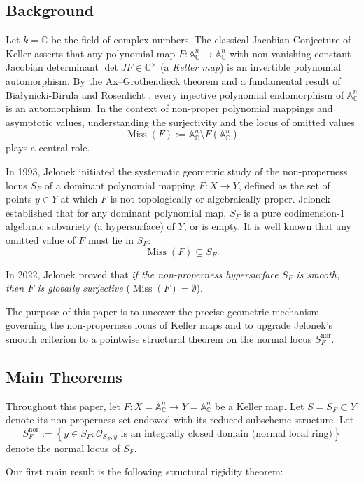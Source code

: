 \documentclass[11pt,reqno]{amsart}
\theoremstyle{plain}
\theoremstyle{definition}
\numberwithin{equation}{section}
\DeclareMathOperator{\Miss}{Miss}
\newcommand{\A}{\mathbb{A}}
\newcommand{\C}{\mathbb{C}}
\newcommand{\cO}{\mathcal{O}}
\begin{document}
\subsection{Background}
Let $k = \C$ be the field of complex numbers. The classical Jacobian Conjecture of Keller \cite{Keller1939} asserts that any polynomial map $F: \A^n_\C \to \A^n_\C$ with non-vanishing constant Jacobian determinant $\det JF \in \C^\times$ (a \emph{Keller map}) is an invertible polynomial automorphism. By the Ax--Grothendieck theorem and a fundamental result of Bia{\l}ynicki-Birula and Rosenlicht \cite{BiaRosen1962}, every injective polynomial endomorphism of $\A^n_\C$ is an automorphism. In the context of non-proper polynomial mappings and asymptotic values, understanding the surjectivity and the locus of omitted values
\[
\Miss(F) := \A^n_\C \setminus F(\A^n_\C)
\]
plays a central role.

In 1993, Jelonek \cite{Jelonek1993} initiated the systematic geometric study of the non-properness locus $S_F$ of a dominant polynomial mapping $F: X \to Y$, defined as the set of points $y \in Y$ at which $F$ is not topologically or algebraically proper. Jelonek established that for any dominant polynomial map, $S_F$ is a pure codimension-1 algebraic subvariety (a hypersurface) of $Y$, or is empty. It is well known that any omitted value of $F$ must lie in $S_F$:
\[
\Miss(F) \subseteq S_F.
\]

In 2022, Jelonek \cite{Jelonek2022} proved that \emph{if the non-properness hypersurface $S_F$ is smooth, then $F$ is globally surjective} ($\Miss(F) = \emptyset$). 

The purpose of this paper is to uncover the precise geometric mechanism governing the non-properness locus of Keller maps and to upgrade Jelonek's smooth criterion to a pointwise structural theorem on the normal locus $S_F^{\mathrm{nor}}$.

\subsection{Main Theorems}
Throughout this paper, let $F: X = \A^n_\C \to Y = \A^n_\C$ be a Keller map. Let $S = S_F \subset Y$ denote its non-properness set endowed with its reduced subscheme structure. Let
\[
S_F^{\mathrm{nor}} := \left\{ y \in S_F : \cO_{S_F, y} \text{ is an integrally closed domain (normal local ring)} \right\}
\]
denote the normal locus of $S_F$.

Our first main result is the following structural rigidity theorem:
\end{document}
